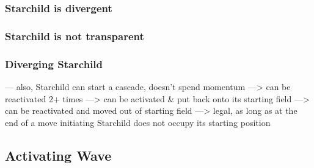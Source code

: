 \clearpage %

\subsubsection*{Starchild is divergent}
\label{sec:One/Starchild/Movement/Starchild is divergent}

\TODO

\clearpage %

\subsubsection*{Starchild is not transparent}
\label{sec:One/Starchild/Movement/Starchild is not transparent}

\TODO

\clearpage %

\subsubsection*{Diverging Starchild}
\label{sec:One/Starchild/Movement/Diverging Starchild}

\TODO

--- also, Starchild can start a cascade, doesn't spend momentum
    ---> can be reactivated 2+ times
    ---> can be activated \& put back onto its starting field
    ---> can be reactivated and moved out of starting field
    ---> legal, as long as at the end of a move initiating Starchild does not occupy its starting position

\clearpage %

\subsection*{Activating Wave}
\label{sec:One/Starchild/Activating Wave}

